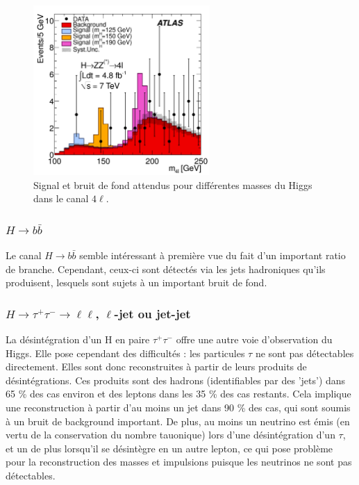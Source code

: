 \documentclass[11pt]{article} %
\begin{document}
\begin{figure}[H]
\centering
  \caption{Signal et bruit de fond attendus pour différentes masses du Higgs dans le canal $4\ell$. \cite{atlas_zz_llll}}
 \includegraphics[width=0.6\textwidth]{../images/atlas_llll_events.png}
\end{figure}


\subsubsection{$H \to b\bar{b}$}

Le canal $H \to b\bar{b}$ semble intéressant à première vue du fait d'un important ratio de branche. Cependant, ceux-ci sont détectés via les jets hadroniques qu'ils produisent, lesquels sont sujets à un important bruit de fond.

\subsubsection{$H \to \tau^+\tau^- \to \ell\ell$, $\ell$-jet ou jet-jet}

La désintégration d'un H en paire $\tau^+ \tau^-$ offre une autre voie d'observation du Higgs. Elle pose cependant des difficultés : les particules $\tau$ ne sont pas détectables directement. Elles sont donc reconstruites à partir de leurs produits de désintégrations. Ces produits sont des hadrons (identifiables par des 'jets') dans 65 \% des cas environ et des leptons dans les 35 \% des cas restants. Cela implique une reconstruction à partir d'au moins un jet dans 90  \% des cas, qui sont soumis à un bruit de  background important. De plus, au moins un neutrino est émis (en vertu de la conservation du nombre tauonique) lors d'une désintégration d'un $\tau$, et un de plus lorsqu'il se désintègre en un autre lepton, ce qui pose problème pour la reconstruction des masses et impulsions puisque les neutrinos ne sont pas détectables.
\end{document}
